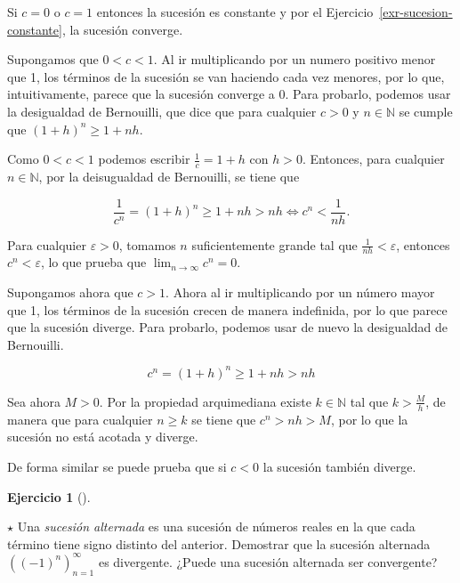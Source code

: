\documentclass[
  spanish,
  a4paper,
]{scrreport}
\theoremstyle{definition}
\newtheorem{exercise}{Ejercicio}[chapter]
\theoremstyle{remark}
\begin{document}
\begin{tcolorbox}[enhanced jigsaw, arc=.35mm, bottomrule=.15mm, bottomtitle=1mm, breakable, colback=white, colbacktitle=quarto-callout-tip-color!10!white, colframe=quarto-callout-tip-color-frame, coltitle=black, left=2mm, leftrule=.75mm, opacityback=0, opacitybacktitle=0.6, rightrule=.15mm, title=\textcolor{quarto-callout-tip-color}{\faLightbulb}\hspace{0.5em}{Solución}, titlerule=0mm, toprule=.15mm, toptitle=1mm]

Si \(c=0\) o \(c=1\) entonces la sucesión es constante y por el
Ejercicio~\ref{exr-sucesion-constante}, la sucesión converge.

Supongamos que \(0<c<1\). Al ir multiplicando por un numero positivo
menor que 1, los términos de la sucesión se van haciendo cada vez
menores, por lo que, intuitivamente, parece que la sucesión converge a
\(0\). Para probarlo, podemos usar la desigualdad de Bernouilli, que
dice que para cualquier \(c>0\) y \(n\in\mathbb{N}\) se cumple que
\((1+h)^n \geq 1+nh\).

Como \(0<c<1\) podemos escribir \(\frac{1}{c}=1+h\) con \(h>0\).
Entonces, para cualquier \(n\in\mathbb{N}\), por la deisugualdad de
Bernouilli, se tiene que

\[
\frac{1}{c^n} = (1+h)^n \geq 1+nh > nh 
\Leftrightarrow c^n < \frac{1}{nh}.
\]

Para cualquier \(\varepsilon>0\), tomamos \(n\) suficientemente grande
tal que \(\frac{1}{nh}<\varepsilon\), entonces \(c^n<\varepsilon\), lo
que prueba que \(\lim_{n\to\infty}c^n=0\).

Supongamos ahora que \(c>1\). Ahora al ir multiplicando por un número
mayor que 1, los términos de la sucesión crecen de manera indefinida,
por lo que parece que la sucesión diverge. Para probarlo, podemos usar
de nuevo la desigualdad de Bernouilli.

\[
c^n = (1+h)^n \geq 1+nh > nh
\]

Sea ahora \(M>0\). Por la propiedad arquimediana existe
\(k\in\mathbb{N}\) tal que \(k>\frac{M}{h}\), de manera que para
cualquier \(n\geq k\) se tiene que \(c^n>nh>M\), por lo que la sucesión
no está acotada y diverge.

De forma similar se puede prueba que si \(c<0\) la sucesión también
diverge.

\end{tcolorbox}

\begin{exercise}[]\protect\hypertarget{exr-sucesion-alternada}{}\label{exr-sucesion-alternada}

\(\star\) Una \emph{sucesión alternada} es una sucesión de números
reales en la que cada término tiene signo distinto del anterior.
Demostrar que la sucesión alternada \(((-1)^n)_{n=1}^\infty\) es
divergente. ¿Puede una sucesión alternada ser convergente?

\end{exercise}
\end{document}

